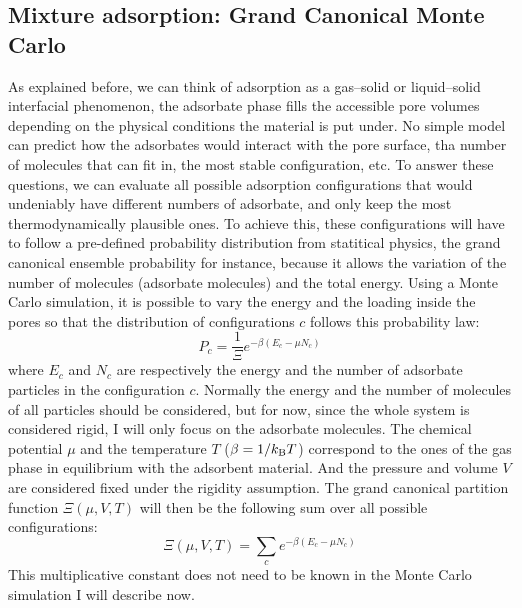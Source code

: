 \documentclass[main.tex]{subfiles}
\begin{document}
\subsection{Mixture adsorption: Grand Canonical Monte Carlo}\label{sct:GCMC}

As explained before, we can think of adsorption as a gas--solid or liquid--solid interfacial phenomenon, the adsorbate phase fills the accessible pore volumes depending on the physical conditions the material is put under. No simple model can predict how the adsorbates would interact with the pore surface, tha number of molecules that can fit in, the most stable configuration, etc. To answer these questions, we can evaluate all possible adsorption configurations that would undeniably have different numbers of adsorbate, and only keep the most thermodynamically plausible ones. To achieve this, these configurations will have to follow a pre-defined probability distribution from statitical physics, the grand canonical ensemble probability for instance, because it allows the variation of the number of molecules (adsorbate molecules) and the total energy. Using a Monte Carlo simulation, it is possible to vary the energy and the loading inside the pores so that the distribution of configurations $c$ follows this probability law: 
\begin{equation}\label{eq:gc}
  P_c = \dfrac{1}{\Xi}e^{-\beta\left(E_c-\mu N_c\right)} 
\end{equation}
where $E_c$ and $N_c$ are respectively the energy and the number of adsorbate particles in the configuration $c$. Normally the energy and the number of molecules of all particles should be considered, but for now, since the whole system is considered rigid, I will only focus on the adsorbate molecules. The chemical potential $\mu$ and the temperature $T$ ($\beta=1/k_{\text{B}}T$) correspond to the ones of the gas phase in equilibrium with the adsorbent material. And the pressure and volume $V$ are considered fixed under the rigidity assumption. The grand canonical partition function $\Xi(\mu,V,T)$ will then be the following sum over all possible configurations: 
\begin{equation}
  \Xi(\mu,V,T) = \sum\limits_c e^{-\beta\left(E_c-\mu N_c\right)} 
\end{equation}
This multiplicative constant does not need to be known in the Monte Carlo simulation I will describe now. 
\end{document}
